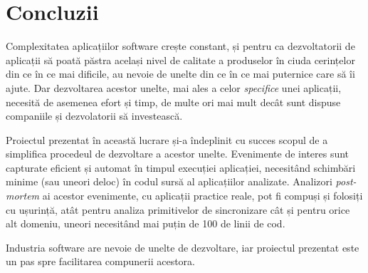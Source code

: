 \section{Concluzii}

Complexitatea aplicațiilor software crește constant, și pentru ca
dezvoltatorii de aplicații să poată păstra același nivel de calitate a
produselor în ciuda cerințelor din ce în ce mai dificile, au nevoie de
unelte din ce în ce mai puternice care să îi ajute. Dar dezvoltarea
acestor unelte, mai ales a celor \textit{specifice} unei aplicații,
necesită de asemenea efort și timp, de multe ori mai mult decât sunt
dispuse companiile și dezvolatorii să investească.

Proiectul prezentat în această lucrare și-a îndeplinit cu succes scopul
de a simplifica procedeul de dezvoltare a acestor unelte. Evenimente
de interes sunt capturate eficient și automat în timpul execuției
aplicației, necesitând schimbări minime (sau uneori deloc) în codul
sursă al aplicațiilor analizate. Analizori \textit{post-mortem} ai
acestor evenimente, cu aplicații practice reale, pot fi compuși și
folosiți cu ușurință, atât pentru analiza primitivelor de sincronizare
cât și pentru orice alt domeniu, uneori necesitând mai puțin de 100 de
linii de cod.

Industria software are nevoie de unelte de dezvoltare, iar proiectul
prezentat este un pas spre facilitarea compunerii acestora.
